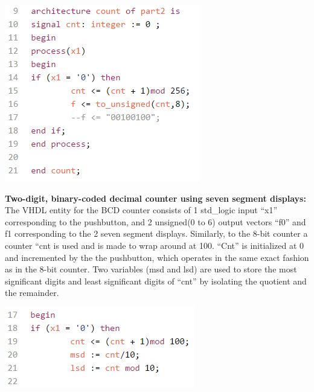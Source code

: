 \documentclass{article}
\newenvironment{Figure}
  {\par\medskip\noindent\ignorespaces\minipage{\linewidth}}
  {\endminipage\par\medskip}
\begin{document}
\begin{multicols*}{2}
\begin{Figure}
 \centering
 \includegraphics[width=\linewidth]{p2code.png}
\end{Figure}



{\bf Two-digit, binary-coded decimal counter using seven segment displays:}\\
The VHDL entity for the BCD counter consists of  1 std\_logic input “x1” corresponding to the pushbutton, and 2 unsigned(0 to 6) output vectors “f0” and f1 corresponding to the 2 seven segment displays. Similarly, to the 8-bit counter a counter “cnt is used and is made to wrap around at 100. “Cnt” is initialized at 0 and incremented by the the pushbutton, which operates in the same exact fashion as in the 8-bit counter. Two variables (msd and lsd) are used to store the most significant digits and least significant digits of “cnt” by isolating the quotient and the remainder.\\

\begin{Figure}
 \centering
 \includegraphics[width=\linewidth]{p3c1.png}
\end{Figure}


\end{multicols*}
\end{document}
